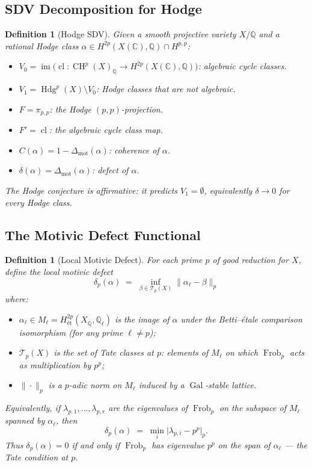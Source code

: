 \documentclass[11pt]{article}
\newtheorem{definition}[theorem]{Definition}
\theoremstyle{definition}
\DeclareMathOperator{\cl}{cl}
\DeclareMathOperator{\Gal}{Gal}
\DeclareMathOperator{\Frob}{Frob}
\DeclareMathOperator{\CH}{CH}
\DeclareMathOperator{\im}{im}
\DeclareMathOperator{\Hdg}{Hdg}
\begin{document}
\subsection{SDV Decomposition for Hodge}

\begin{definition}[Hodge SDV]
\label{def:hodge-sdv}
Given a smooth projective variety $X/\mathbb{Q}$ and a rational Hodge class
$\alpha \in H^{2p}(X(\mathbb{C}), \mathbb{Q}) \cap H^{p,p}$:
\begin{itemize}
  \item $V_0 = \im\bigl(\cl : \CH^p(X)_{\mathbb{Q}} \to H^{2p}(X(\mathbb{C}), \mathbb{Q})\bigr)$:
    algebraic cycle classes.
  \item $V_1 = \Hdg^p(X) \setminus V_0$: Hodge classes that are not algebraic.
  \item $F = \pi_{p,p}$: the Hodge $(p,p)$-projection.
  \item $F' = \cl$: the algebraic cycle class map.
  \item $C(\alpha) = 1 - \Delta_{\mathrm{mot}}(\alpha)$: coherence of $\alpha$.
  \item $\delta(\alpha) = \Delta_{\mathrm{mot}}(\alpha)$: defect of $\alpha$.
\end{itemize}
The Hodge conjecture is \emph{affirmative}: it predicts $V_1 = \emptyset$,
equivalently $\delta \to 0$ for every Hodge class.
\end{definition}

\subsection{The Motivic Defect Functional}

\begin{definition}[Local Motivic Defect]
\label{def:local-defect}
For each prime $p$ of good reduction for $X$, define the \emph{local motivic
defect}
\[
  \delta_p(\alpha)
  \;=\;
  \inf_{\beta \in \mathcal{T}_p(X)}
  \bigl\| \alpha_\ell - \beta \bigr\|_p
\]
where:
\begin{itemize}
  \item $\alpha_\ell \in M_\ell = H^{2p}_{\text{\'et}}(X_{\bar{\mathbb{Q}}}, \mathbb{Q}_\ell)$
    is the image of $\alpha$ under the Betti--\'etale comparison isomorphism
    (for any prime $\ell \neq p$);
  \item $\mathcal{T}_p(X)$ is the set of \emph{Tate classes} at $p$: elements
    of $M_\ell$ on which $\Frob_p$ acts as multiplication by $p^p$;
  \item $\|\cdot\|_p$ is a $p$-adic norm on $M_\ell$ induced by a
    $\Gal$-stable lattice.
\end{itemize}
Equivalently, if $\lambda_{p,1}, \ldots, \lambda_{p,r}$ are the eigenvalues
of $\Frob_p$ on the subspace of $M_\ell$ spanned by $\alpha_\ell$, then
\[
  \delta_p(\alpha) \;=\; \min_i \bigl|\lambda_{p,i} - p^p\bigr|_p.
\]
Thus $\delta_p(\alpha) = 0$ if and only if $\Frob_p$ has eigenvalue $p^p$ on the
span of $\alpha_\ell$ --- the Tate condition at $p$.
\end{definition}
\end{document}
